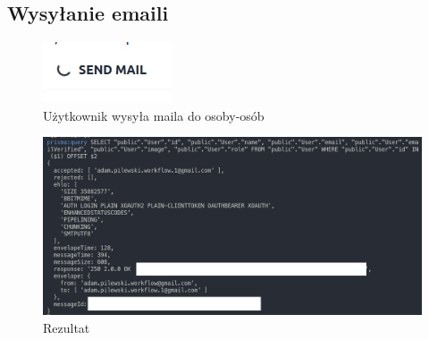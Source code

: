\documentclass[a4paper, 12pt]{article}
\begin{document}
\subsection{Wysyłanie emaili}
\begin{figure}[H]
	\centering
    \includegraphics*[scale=0.4]{img/send-email.png}
	\caption{Użytkownik wysyła maila do osoby-osób}
\end{figure}
\begin{figure}[H]
	\centering
    \includegraphics*[scale=0.3]{img/send-email-2.png}
	\caption{Rezultat}
\end{figure}
\end{document}
